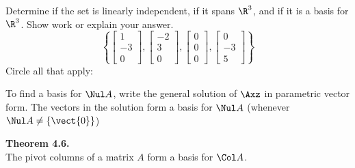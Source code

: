 \begin{exercise} %
	Determine if the set is linearly independent, if it spans $\R^3$, and if it is a basis for $\R^3$. Show work or explain your answer.
	$$ \left\{
	\begin{bmatrix}1\\-3\\0\end{bmatrix},
	\begin{bmatrix}-2\\3\\0\end{bmatrix},
	\begin{bmatrix}0\\0\\0\end{bmatrix},
	\begin{bmatrix}0\\-3\\5\end{bmatrix}
	\right\} $$
	Circle all that apply:
	\begin{center}
		 \hspace{5em}
		 \hspace{5em}
	\end{center}
\end{exercise}
\vfill


\newpage

\begin{boxme}
	To find a basis for $\Nul A$, write the general solution of $\Axz$ in parametric vector form. The vectors in the solution form a basis for $\Nul A$ (whenever $\Nul A \neq \{\vect{0}\}$)
\end{boxme}
\begin{boxthm}
	\textbf{Theorem 4.6.} \\
	The pivot columns of a matrix $A$ form a basis for $\Col A$.
\end{boxthm}


